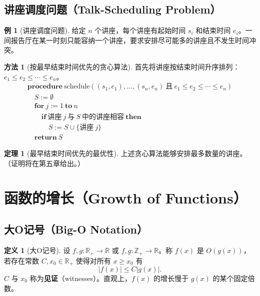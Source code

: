 \documentclass[UTF8,11pt,a4paper]{ctexbook}   %
\theoremstyle{definition}
\newtheorem{definition}{定义}[section]
\newtheorem{theorem}{定理}[section]
\newtheorem{example}{例}[section]
\newtheorem{method}{方法}[section]
\begin{document}
\subsection{讲座调度问题（Talk-Scheduling Problem）}

\begin{example}[讲座调度问题]
给定 $n$ 个讲座，每个讲座有起始时间 $s_i$ 和结束时间 $e_i$。一间报告厅在某一时刻只能容纳一个讲座，要求安排尽可能多的讲座且不发生时间冲突。
\end{example}

\begin{method}[按最早结束时间优先的贪心算法]
首先将讲座按结束时间升序排列：$e_1 \leq e_2 \leq \cdots \leq e_n$。
\[
\begin{array}{l}
\textbf{procedure}\ \text{schedule}((s_1, e_1), \ldots, (s_n, e_n)\ \text{且}\ e_1 \leq e_2 \leq \cdots \leq e_n)\\
\quad S := \emptyset\\
\quad \textbf{for}\ j := 1\ \textbf{to}\ n\\
\quad \quad \textbf{if}\ \text{讲座}\ j\ \text{与}\ S\ \text{中的讲座相容}\ \textbf{then}\\
\quad \quad \quad S := S \cup \{\text{讲座}\ j\}\\
\quad \textbf{return}\ S
\end{array}
\]
\end{method}

\begin{theorem}[最早结束时间优先的最优性]
上述贪心算法能够安排最多数量的讲座。（证明将在第五章给出。）
\end{theorem}

\section{函数的增长（Growth of Functions）}

\subsection{大O记号（Big-O Notation）}

\begin{definition}[大O记号]
设 $f,g: \mathbb{R}_+ \to \mathbb{R}$ 或 $f,g: \mathbb{Z}_+ \to \mathbb{R}$。称 $f(x)$ 是 $O(g(x))$，若存在常数 $C, x_0 \in \mathbb{R}_+$ 使得对所有 $x \geq x_0$ 有
\[
|f(x)| \leq C|g(x)|.
\]
$C$ 与 $x_0$ 称为\textbf{见证}（witnesses）。直观上，$f(x)$ 的增长慢于 $g(x)$ 的某个固定倍数。
\end{definition}
\end{document}
